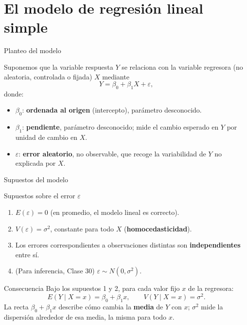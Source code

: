 \documentclass[aspectratio=169,11pt]{beamer}
\begin{document}
\section{El modelo de regresión lineal simple}

\begin{frame}{Planteo del modelo}
\begin{definition}
Suponemos que la variable respuesta $Y$ se relaciona con la variable regresora (no aleatoria, controlada o fijada) $X$ mediante
\[
Y = \beta_0 + \beta_1 X + \varepsilon,
\]
donde:
\begin{itemize}
\item $\beta_0$: \textbf{ordenada al origen} (intercepto), parámetro desconocido.
\item $\beta_1$: \textbf{pendiente}, parámetro desconocido; mide el cambio esperado en $Y$ por unidad de cambio en $X$.
\item $\varepsilon$: \textbf{error aleatorio}, no observable, que recoge la variabilidad de $Y$ no explicada por $X$.
\end{itemize}
\end{definition}
\end{frame}

\begin{frame}{Supuestos del modelo}
\begin{block}{Supuestos sobre el error $\varepsilon$}
\begin{enumerate}
\item $E(\varepsilon) = 0$ (en promedio, el modelo lineal es correcto).
\item $V(\varepsilon) = \sigma^2$, constante para todo $X$ (\textbf{homocedasticidad}).
\item Los errores correspondientes a observaciones distintas son \textbf{independientes} entre sí.
\item (Para inferencia, Clase 30) $\varepsilon \sim N(0,\sigma^2)$.
\end{enumerate}
\end{block}

\begin{alertblock}{Consecuencia}
Bajo los supuestos 1 y 2, para cada valor fijo $x$ de la regresora:
\[
E(Y \mid X=x) = \beta_0 + \beta_1 x, \qquad V(Y \mid X = x) = \sigma^2.
\]
La recta $\beta_0+\beta_1 x$ describe cómo cambia la \textbf{media} de $Y$ con $x$; $\sigma^2$ mide la dispersión alrededor de esa media, la misma para todo $x$.
\end{alertblock}
\end{frame}
\end{document}
